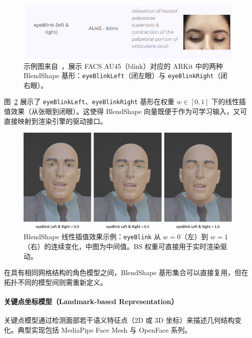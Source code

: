 \begin{figure}[h!t]
\centering
\includegraphics[width=0.95\linewidth]{figures/Fig_AUSample.png}
\caption{示例图来自~\cite{ozel_arkit_facs_cheatsheet}，展示 FACS AU45（blink）对应的 ARKit 中的两种 BlendShape 基形：\texttt{eyeBlinkLeft}（闭左眼）与 \texttt{eyeBlinkRight}（闭右眼）。}
\label{fig:au_sample}
\end{figure}

图~\ref{fig:bs_eyeblink} 展示了 \texttt{eyeBlinkLeft}、\texttt{eyeBlinkRight} 基形在权重 $w\!\in\![0,1]$ 下的线性插值效果（从张眼到闭眼）。这使得 BlendShape 向量既便于作为可学习输入，又可直接映射到渲染引擎的驱动接口。

\begin{figure}[h!t]
\centering
\includegraphics[width=0.95\linewidth]{figures/Fig_blendshapeEyeBlink.png}
\caption{BlendShape 线性插值效果示例：\texttt{eyeBlink} 从 $w{=}0$（左）到 $w{=}1$（右）的连续变化，中图为中间值。BS 权重可直接用于实时渲染驱动。}
\label{fig:bs_eyeblink}
\end{figure}

在具有相同网格结构的角色模型之间，BlendShape 基形集合可以直接复用，但在拓扑不同的模型间则需重新定义。

\paragraph{关键点坐标模型（Landmark-based Representation）}
关键点模型通过检测面部若干语义特征点（2D 或 3D 坐标）来描述几何结构变化。典型实现包括 MediaPipe Face Mesh \cite{mediapipefacemesh} 与 OpenFace 系列。

